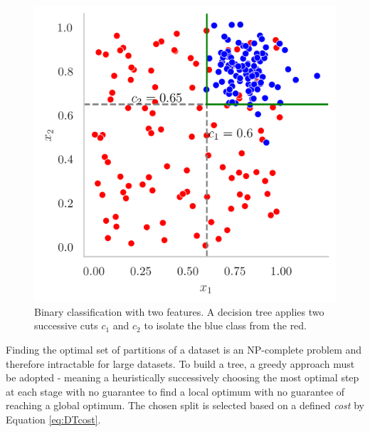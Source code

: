 \begin{figure}[h!]
    \center
    \begin{minipage}[c]{0.3\textwidth}
        \caption{Binary classification with two features. A decision tree applies two successive cuts $c_1$ and $c_2$ to isolate the blue class from the red.}\label{fig:tree-ex}
      \end{minipage}
      \begin{minipage}[c]{0.5\textwidth}
        \includegraphics[width=\textwidth]{Images/ML/scatterPlot.png}
      \end{minipage}
\end{figure}

    
Finding the optimal set of partitions of a dataset is an NP-complete problem and therefore intractable for large datasets. To build a tree, a greedy approach must be adopted - meaning a heuristically successively choosing the most optimal step at each stage with no guarantee to find a local optimum with no guarantee of reaching a global optimum. The chosen split is selected based on a defined \textit{cost} by Equation \ref{eq:DTcost}.

